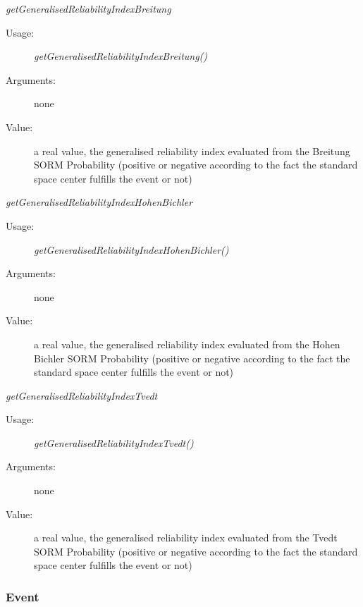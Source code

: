 \begin{description}
\begin{description}
\item \textit{getGeneralisedReliabilityIndexBreitung}
\begin{description}
\item[Usage:] \textit{getGeneralisedReliabilityIndexBreitung()}
\item[Arguments:] none
\item[Value:]  a  real value, the generalised reliability index evaluated from the Breitung SORM Probability (positive or negative according to the fact the standard space center fulfills the event or not)
\end{description}
\bigskip

\item \textit{getGeneralisedReliabilityIndexHohenBichler}
\begin{description}
\item[Usage:] \textit{getGeneralisedReliabilityIndexHohenBichler()}
\item[Arguments:] none
\item[Value:]  a  real value, the generalised reliability index evaluated from the Hohen Bichler SORM Probability (positive or negative according to the fact the standard space center fulfills the event or not)
\end{description}
\bigskip

\item \textit{getGeneralisedReliabilityIndexTvedt}
\begin{description}
\item[Usage:] \textit{getGeneralisedReliabilityIndexTvedt()}
\item[Arguments:] none
\item[Value:]  a  real value, the generalised reliability index evaluated from the Tvedt SORM Probability (positive or negative according to the fact the standard space center fulfills the event or not)
\end{description}
\bigskip
\end{description}


\end{description}



\newpage
\subsubsection{Event}



